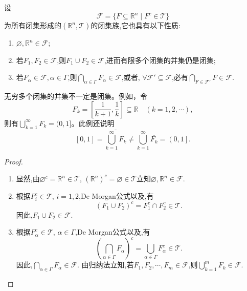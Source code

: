 \documentclass[../../main.tex]{subfiles}%
\begin{document}
\begin{theorem}[闭集的基本性质]\label{theorem:引理1.4.1-实变函数}
设
\[
\mathscr{F}=\{F\subseteq\mathbb{R}^n\mid F^c\in\mathscr{T}\}
\]
为所有闭集形成的$(\mathbb{R}^n,\mathscr{T})$的闭集族,它也具有以下性质:
\begin{enumerate}[(1)]
\item\label{theorem:引理1.4.1-实变函数-1} $\varnothing,\mathbb{R}^n\in\mathscr{F}$;

\item\label{theorem:引理1.4.1-实变函数-2} 若$F_1,F_2\in\mathscr{F}$,则$F_1\cup F_2\in\mathscr{F}$,进而有限多个闭集的并集仍是闭集;

\item\label{theorem:引理1.4.1-实变函数-3} 若$F_\alpha\in\mathscr{F},\alpha\in\Gamma$,则$\bigcap_{\alpha\in\Gamma}F_\alpha\in\mathscr{F}$,或者, $\forall\mathscr{F}'\subseteq\mathscr{F}$,必有$\bigcap_{F\in\mathscr{F}'}F\in\mathscr{F}$.
\end{enumerate}
\end{theorem}
\begin{remark}
无穷多个闭集的并集不一定是闭集。例如，令
\[F_k=\left[\frac{1}{k + 1},\frac{1}{k}\right]\subseteq\mathbb{R}\quad(k = 1,2,\cdots),\]
则有\(\bigcup_{k = 1}^{\infty}F_k=(0,1]\)。此例还说明
\[\left[ 0,1 \right] =\overline{\bigcup_{k=1}^{\infty}{F_k}}\ne \bigcup_{k=1}^{\infty}{\overline{F_k}}=\left( 0,1 \right] .\]
\end{remark}
\begin{proof}
\begin{enumerate}[(1)]
\item 显然,由$\varnothing^c=\mathbb{R}^n\in\mathscr{T}$, $(\mathbb{R}^n)^c=\varnothing\in\mathscr{T}$立知$\varnothing,\mathbb{R}^n\in\mathscr{F}$.

\item 根据$F_i^c\in\mathscr{T}$, $i=1,2$,De Morgan公式以及,有
\[
(F_1\cup F_2)^c=F_1^c\cap F_2^c\in\mathscr{T}.
\]
因此,$F_1\cup F_2\in\mathscr{F}$.

\item 根据$F_\alpha^c\in\mathscr{T}$, $\alpha\in\Gamma$,De Morgan公式以及,有
\[
\left(\bigcap_{\alpha\in\Gamma}F_\alpha\right)^c=\bigcup_{\alpha\in\Gamma}F_\alpha^c\in\mathscr{T}.
\]
因此,$\bigcap_{\alpha\in\Gamma}F_\alpha\in\mathscr{F}$.
由归纳法立知,若$F_1,F_2,\cdots,F_m\in\mathscr{F}$,则$\bigcup_{k=1}^m F_k\in\mathscr{F}$.
\end{enumerate}
\end{proof}
\end{document}
